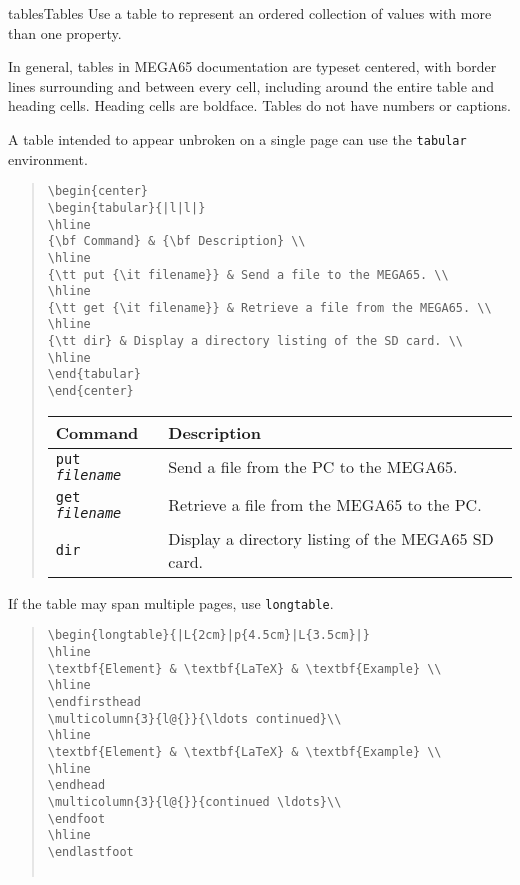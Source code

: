 \begin{sgentry}{tables}{Tables}
    Use a table to represent an ordered collection of values with more than one property.

    In general, tables in MEGA65 documentation are typeset centered, with border lines surrounding and between every cell, including around the entire table and heading cells. Heading cells are boldface. Tables do not have numbers or captions.

    A table intended to appear unbroken on a single page can use the \texttt{tabular} environment.

    \begin{quote}
\begin{verbatim}
\begin{center}
\begin{tabular}{|l|l|}
\hline
{\bf Command} & {\bf Description} \\
\hline
{\tt put {\it filename}} & Send a file to the MEGA65. \\
\hline
{\tt get {\it filename}} & Retrieve a file from the MEGA65. \\
\hline
{\tt dir} & Display a directory listing of the SD card. \\
\hline
\end{tabular}
\end{center}
\end{verbatim}

\hrulefill

        \begin{center}
        \begin{tabular}{|l|l|}
        \hline
        {\bf Command} & {\bf Description} \\
        \hline
        {\tt put {\it filename}} & Send a file from the PC to the MEGA65. \\
        \hline
        {\tt get {\it filename}} & Retrieve a file from the MEGA65 to the PC. \\
        \hline
        {\tt dir} & Display a directory listing of the MEGA65 SD card. \\
        \hline
        \end{tabular}
        \end{center}
    \end{quote}

    If the table may span multiple pages, use \texttt{longtable}.

\begin{quote}
\begin{verbatim}
\begin{longtable}{|L{2cm}|p{4.5cm}|L{3.5cm}|}
\hline
\textbf{Element} & \textbf{LaTeX} & \textbf{Example} \\
\hline
\endfirsthead
\multicolumn{3}{l@{}}{\ldots continued}\\
\hline
\textbf{Element} & \textbf{LaTeX} & \textbf{Example} \\
\hline
\endhead
\multicolumn{3}{l@{}}{continued \ldots}\\
\endfoot
\hline
\endlastfoot


\end{verbatim}
\end{quote}
\end{sgentry}
